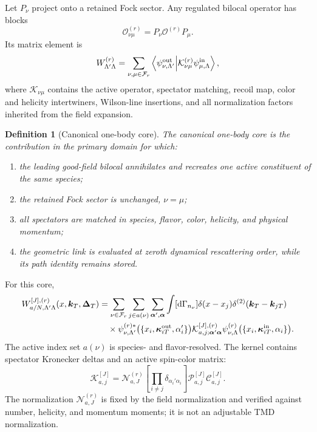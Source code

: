 \documentclass[11pt]{article}
\newtheorem{definition}{Definition}[section]
\newcommand{\kT}{\bm{k}_{T}}
\newcommand{\DT}{\bm{\Delta}_{T}}
\newcommand{\dd}{\mathrm{d}}
\newcommand{\cO}{\mathcal O}
\newcommand{\cK}{\mathcal K}
\newcommand{\cP}{\mathcal P}
\newcommand{\cC}{\mathcal C}
\newcommand{\cN}{\mathcal N}
\newcommand{\cF}{\mathcal F}
\newcommand{\inner}[2]{\left\langle #1\middle|#2\right\rangle}
\begin{document}
Let \(P_\nu\) project onto a retained Fock sector.  Any regulated bilocal
operator has blocks
\begin{equation}
 \cO^{(r)}_{\nu\mu}=P_\nu\cO^{(r)}P_\mu.
\label{eq:operator-block}
\end{equation}
Its matrix element is
\begin{equation}
 W^{(r)}_{\Lambda'\Lambda}
 =\sum_{\nu,\mu\in\cF_r}
 \inner{\psi_{\nu,\Lambda'}^{\rm out}}
        {\cK^{(r)}_{\nu\mu}
         \psi_{\mu,\Lambda}^{\rm in}},
\label{eq:general-block-overlap}
\end{equation}
where \(\cK_{\nu\mu}\) contains the active operator, spectator matching,
recoil map, color and helicity intertwiners, Wilson-line insertions, and all
normalization factors inherited from the field expansion.

\begin{definition}[Canonical one-body core]
\label{def:canonical-one-body}
The canonical one-body core is the contribution in the primary domain for
which:
\begin{enumerate}
\item the leading good-field bilocal annihilates and recreates one active
      constituent of the same species;
\item the retained Fock sector is unchanged, \(\nu=\mu\);
\item all spectators are matched in species, flavor, color, helicity, and
      physical momentum;
\item the geometric link is evaluated at zeroth dynamical rescattering order,
      while its path identity remains stored.
\end{enumerate}
\end{definition}

For this core,
\begin{align}
 W_{a/N,\Lambda'\Lambda}^{[J],(r)}
 (x,\kT,\DT)
 &=\sum_{\nu\in\cF_r}
   \sum_{j\in a(\nu)}
   \sum_{\boldsymbol\alpha',\boldsymbol\alpha}
   \int[\dd\Gamma_{n_\nu}]
   \delta(x-x_j)
   \delta^{(2)}(\kT-\bm{k}_{jT})
\nonumber\\
 &\quad\times
 \psi_{\nu,\Lambda'}^{(r)*}
 \bigl(\{x_i,\bm\kappa_{iT}^{\rm out},\alpha_i'\}\bigr)
 \cK_{a,j;\boldsymbol\alpha'\boldsymbol\alpha}^{[J],(r)}
 \psi_{\nu,\Lambda}^{(r)}
 \bigl(\{x_i,\bm\kappa_{iT}^{\rm in},\alpha_i\}\bigr).
\label{eq:master-diagonal-overlap}
\end{align}
The active index set \(a(\nu)\) is species- and flavor-resolved.  The kernel
contains spectator Kronecker deltas and an active spin-color matrix:
\begin{equation}
 \cK_{a,j}^{[J]}
 =\cN_{a,J}^{(r)}
 \left[\prod_{i\ne j}
 \delta_{\alpha_i'\alpha_i}\right]
 \cP_{a,j}^{[J]}
 \cC_{a,j}^{[J]}.
\label{eq:active-kernel-factor}
\end{equation}
The normalization \(\cN_{a,J}^{(r)}\) is fixed by the field normalization and
verified against number, helicity, and momentum moments; it is not an
adjustable TMD normalization.
\end{document}
